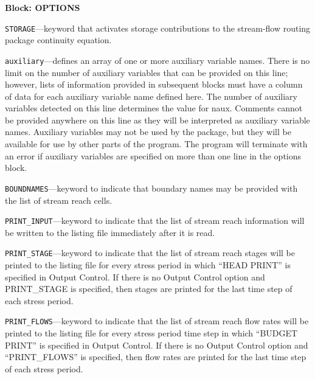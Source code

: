 
\item \textbf{Block: OPTIONS}

\begin{description}
\item \texttt{STORAGE}---keyword that activates storage contributions to the stream-flow routing package continuity equation.

\item \texttt{auxiliary}---defines an array of one or more auxiliary variable names.  There is no limit on the number of auxiliary variables that can be provided on this line; however, lists of information provided in subsequent blocks must have a column of data for each auxiliary variable name defined here.   The number of auxiliary variables detected on this line determines the value for naux.  Comments cannot be provided anywhere on this line as they will be interpreted as auxiliary variable names.  Auxiliary variables may not be used by the package, but they will be available for use by other parts of the program.  The program will terminate with an error if auxiliary variables are specified on more than one line in the options block.

\item \texttt{BOUNDNAMES}---keyword to indicate that boundary names may be provided with the list of stream reach cells.

\item \texttt{PRINT\_INPUT}---keyword to indicate that the list of stream reach information will be written to the listing file immediately after it is read.

\item \texttt{PRINT\_STAGE}---keyword to indicate that the list of stream reach stages will be printed to the listing file for every stress period in which ``HEAD PRINT'' is specified in Output Control.  If there is no Output Control option and PRINT\_STAGE is specified, then stages are printed for the last time step of each stress period.

\item \texttt{PRINT\_FLOWS}---keyword to indicate that the list of stream reach flow rates will be printed to the listing file for every stress period time step in which ``BUDGET PRINT'' is specified in Output Control.  If there is no Output Control option and ``PRINT\_FLOWS'' is specified, then flow rates are printed for the last time step of each stress period.


\end{description}

